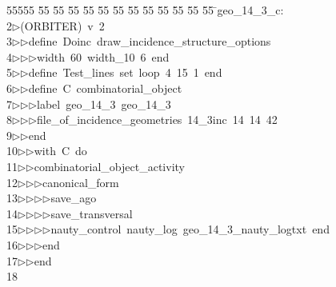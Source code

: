 %
%
\begin{tabbing}
55555 \= 55 \= 55 \= 55 \= 55 \= 55 \= 55 \= 55 \= 55 \= 55 \= 55 \= 55 \= 55 \= \>geo\_14\_3\_c:\\[0pt]
2\>$\triangleright$\>(ORBITER)\ v\ 2\ \\[0pt]
3\>$\triangleright$\>$\triangleright$\>define\ Doinc\ draw\_incidence\_structure\_options\ \\[0pt]
4\>$\triangleright$\>$\triangleright$\>$\triangleright$\>width\ 60\ width\_10\ 6\ end\ \\[0pt]
5\>$\triangleright$\>$\triangleright$\>define\ Test\_lines\ set\ loop\ 4\ 15\ 1\ end\ \\[0pt]
6\>$\triangleright$\>$\triangleright$\>define\ C\ combinatorial\_object\ \\[0pt]
7\>$\triangleright$\>$\triangleright$\>$\triangleright$\>label\ geo\_14\_3\ geo\_14\_3\ \\[0pt]
8\>$\triangleright$\>$\triangleright$\>$\triangleright$\>file\_of\_incidence\_geometries\ 14\_3inc\ 14\ 14\ 42\ \\[0pt]
9\>$\triangleright$\>$\triangleright$\>end\ \\[0pt]
10\>$\triangleright$\>$\triangleright$\>with\ C\ do\ \\[0pt]
11\>$\triangleright$\>$\triangleright$\>combinatorial\_object\_activity\ \\[0pt]
12\>$\triangleright$\>$\triangleright$\>$\triangleright$\>canonical\_form\ \\[0pt]
13\>$\triangleright$\>$\triangleright$\>$\triangleright$\>$\triangleright$\>save\_ago\ \\[0pt]
14\>$\triangleright$\>$\triangleright$\>$\triangleright$\>$\triangleright$\>save\_transversal\ \\[0pt]
15\>$\triangleright$\>$\triangleright$\>$\triangleright$\>$\triangleright$\>nauty\_control\ nauty\_log\ geo\_14\_3\_nauty\_logtxt\ end\ \\[0pt]
16\>$\triangleright$\>$\triangleright$\>$\triangleright$\>end\ \\[0pt]
17\>$\triangleright$\>$\triangleright$\>end\\[0pt]
18\>\end{tabbing}
